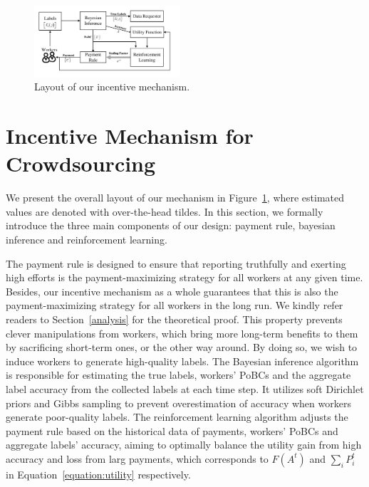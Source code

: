 \begin{figure}[t]
 	\centering
	\includegraphics[width=0.48\textwidth]{image/Architecture}
	\vspace*{-8mm}
    \caption{\label{figure:layout} Layout of our incentive mechanism.}
\end{figure}
\section{Incentive Mechanism for Crowdsourcing}
We present the overall layout of our mechanism in Figure~\ref{figure:layout}, where estimated values are denoted with over-the-head tildes. In this section, we formally introduce the three main components of our design: payment rule, bayesian inference and reinforcement learning.

The payment rule is designed to ensure that reporting truthfully and exerting high efforts  is the payment-maximizing strategy for all workers at any given time. Besides, our incentive mechanism as a whole guarantees that this is also the payment-maximizing strategy for all workers in the long run. We kindly refer readers to Section~\ref{analysis} for the theoretical proof. This property prevents clever manipulations from workers, which bring more long-term benefits to them by sacrificing short-term ones, or the other way around. 
By doing so, we wish to induce workers to generate high-quality labels. %
The Bayesian inference algorithm is responsible for estimating the true labels, workers' PoBCs and the aggregate label accuracy from the collected labels at each time step. It utilizes soft Dirichlet priors and Gibbs sampling to prevent overestimation of accuracy when workers generate poor-quality labels. The reinforcement learning algorithm adjusts the payment rule based on the historical data of payments, workers' PoBCs and aggregate labels' accuracy, aiming to optimally balance the utility gain from high accuracy and loss from larg payments, which corresponds to $F(A^t)$ and $\sum_{i}P_i^t$ in Equation~\ref{equation:utility} respectively.


